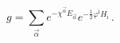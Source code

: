 \begin{equation}
\label{defg} g =
\sum_{\vec\alpha }e^{-\chi^{\vec\alpha} E_{\vec\alpha}} e^{-\frac{1}{2}
\varphi^{\hat\imath}  H_{\hat \imath}}\, .
\end{equation} 
